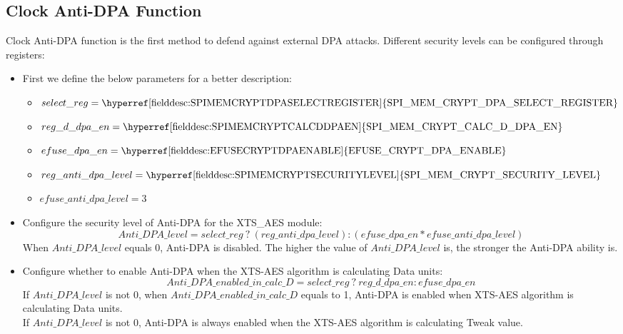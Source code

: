 \documentclass[main\_\_EN.tex]{subfiles}
\begin{document}
\subsection{Clock Anti-DPA Function}
Clock Anti-DPA function is the first method to defend against external DPA attacks. Different security levels can be configured through registers:
\begin{itemize}
    \item First we define the below parameters for a better description:
    \begin{itemize}
        \item $select\_reg     = \textrm{\hyperref[fielddesc:SPIMEMCRYPTDPASELECTREGISTER]{SPI\_MEM\_CRYPT\_DPA\_SELECT\_REGISTER}}$
        \item $reg\_d\_dpa\_en = \textrm{\hyperref[fielddesc:SPIMEMCRYPTCALCDDPAEN]{SPI\_MEM\_CRYPT\_CALC\_D\_DPA\_EN}}$
        \item $efuse\_dpa\_en  = \textrm{\hyperref[fielddesc:EFUSECRYPTDPAENABLE]{EFUSE\_CRYPT\_DPA\_ENABLE}}$
        \item $reg\_anti\_dpa\_level = \textrm{\hyperref[fielddesc:SPIMEMCRYPTSECURITYLEVEL]{SPI\_MEM\_CRYPT\_SECURITY\_LEVEL}}$
        \item $efuse\_anti\_dpa\_level = \textrm{3}$
    \end{itemize}
    \item Configure the security level of Anti-DPA for the XTS\_AES module:
    $$ Anti\_DPA\_level = select\_reg \ ?\  (reg\_anti\_dpa\_level) : (efuse\_dpa\_en * efuse\_anti\_dpa\_level) $$
    When $Anti\_DPA\_level$ equals 0, Anti-DPA is disabled. The higher the value of $Anti\_DPA\_level$ is, the stronger the Anti-DPA ability is.
    \item Configure whether to enable Anti-DPA when the XTS-AES algorithm is calculating Data units:
    $$ Anti\_DPA\_enabled\_in\_calc\_D = select\_reg \ ? \ reg\_d\_dpa\_en : efuse\_dpa\_en $$
    If $Anti\_DPA\_level$ is not 0, when $ Anti\_DPA\_enabled\_in\_calc\_D $ equals to 1, Anti-DPA is enabled when XTS-AES algorithm is calculating Data units.\\
    If $Anti\_DPA\_level$ is not 0, Anti-DPA is always enabled when the XTS-AES algorithm is calculating Tweak value.
\end{itemize}
\end{document}
